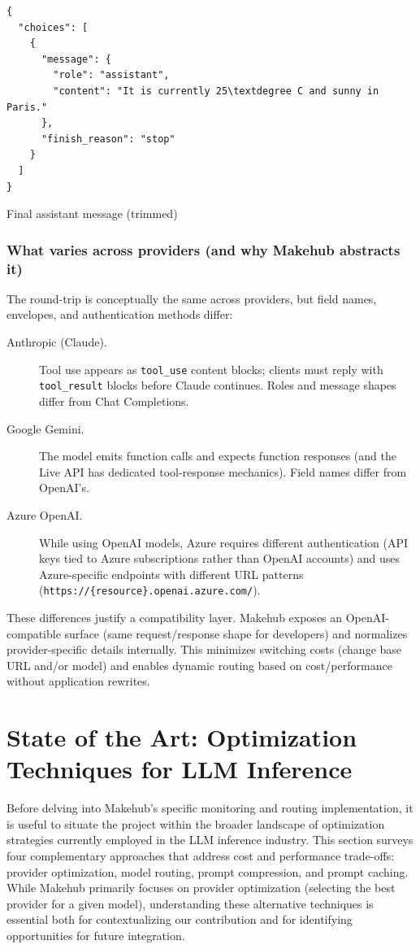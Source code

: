 \documentclass[english]{article}
\begin{document}
\begin{listing}[H]
\begin{verbatim}
{
  "choices": [
    {
      "message": {
        "role": "assistant",
        "content": "It is currently 25\textdegree C and sunny in Paris."
      },
      "finish_reason": "stop"
    }
  ]
}
\end{verbatim}
\caption{Final assistant message (trimmed)}
\end{listing}


\subsubsection{What varies across providers (and why Makehub abstracts it)}

The round-trip is conceptually the same across providers, but field names, envelopes, and authentication methods differ:
\begin{description}
  \item[Anthropic (Claude).] Tool use appears as \texttt{tool\_use} content blocks; clients must reply with \texttt{tool\_result} blocks before Claude continues. Roles and message shapes differ from Chat Completions.
  \item[Google Gemini.] The model emits function calls and expects function responses (and the Live API has dedicated tool-response mechanics). Field names differ from OpenAI's.
  \item[Azure OpenAI.] While using OpenAI models, Azure requires different authentication (API keys tied to Azure subscriptions rather than OpenAI accounts) and uses Azure-specific endpoints with different URL patterns (\texttt{https://\{resource\}.openai.azure.com/}).
\end{description}

These differences justify a compatibility layer. Makehub exposes an OpenAI-compatible surface (same request/response shape for developers) and normalizes provider-specific details internally. This minimizes switching costs (change base URL and/or model) and enables dynamic routing based on cost/performance without application rewrites.


\newpage
\section{State of the Art: Optimization Techniques for LLM Inference}

Before delving into Makehub's specific monitoring and routing implementation, it is useful to situate the project within the broader landscape of optimization strategies currently employed in the LLM inference industry. This section surveys four complementary approaches that address cost and performance trade-offs: provider optimization, model routing, prompt compression, and prompt caching. While Makehub primarily focuses on provider optimization (selecting the best provider for a given model), understanding these alternative techniques is essential both for contextualizing our contribution and for identifying opportunities for future integration.
\end{document}
